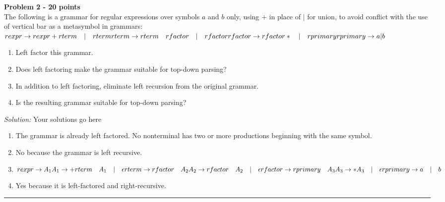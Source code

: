 \documentclass[a4paper, 11pt]{article}
\newenvironment{problem}[2][Problem]
    { \begin{mdframed}[backgroundcolor=gray!20] \textbf{#1 #2} \\}
    {  \end{mdframed}}
\newenvironment{solution}
    {\textit{Solution:}}
    {}
\begin{document}
\begin{problem}{2 - 20 points}
The following is a grammar for regular expressions over symbols $a$ and $b$ only, using $+$ in place of $|$ for union, to avoid conflict with the use  of vertical bar as a metasymbol in grammars:  \\

\noindent $rexpr \rightarrow rexpr + rterm \quad | \quad rterm  \\
    rterm \rightarrow rterm  \quad rfactor \quad | \quad rfactor  \\
    rfactor \rightarrow rfactor * \quad | \quad rprimary  \\
    rprimary \rightarrow a | b$ \\

\begin{enumerate}[a]
    \item Left factor this grammar.
    \item Does left factoring make the grammar suitable for top-down parsing?
    \item In addition to left factoring, eliminate left recursion from the original  grammar.
    \item Is the resulting grammar suitable for top-down parsing?
\end{enumerate}

\end{problem}
\begin{solution}
    Your solutions go here
    \begin{enumerate}[a]
        \item The grammar is already left factored. No nonterminal has two or more productions beginning with the same symbol.
        \item No because the grammar is left recursive.
        \item \noindent $rexpr \rightarrow A_1\\
        A_1 \rightarrow +rterm \quad A_1 \quad | \quad \epsilon\\
        rterm \rightarrow rfactor \quad A_2\\
        A_2 \rightarrow rfactor \quad A_2 \quad | \quad \epsilon\\
        rfactor \rightarrow rprimary \quad A_3\\
        A_3 \rightarrow * A_3 \quad | \quad \epsilon\\
        rprimary \rightarrow a \quad | \quad b$
        \item Yes because it is left-factored and right-recursive.
    \end{enumerate}
\end{solution}
\noindent\rule{7in}{2.8pt}
\end{document}
